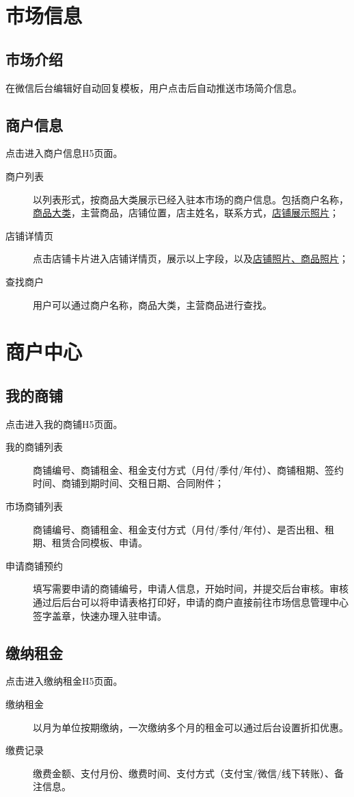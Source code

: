 \documentclass[12pt,a4paper,openany]{ctexrep}
\begin{document}
\section{市场信息}
\subsection{市场介绍}
在微信后台编辑好自动回复模板，用户点击后自动推送市场简介信息。

\subsection{商户信息}
点击进入商户信息H5页面。
\begin{description}
\item[商户列表]以列表形式，按商品大类展示已经入驻本市场的商户信息。包括商户名称，\hyperref[main_business]{商品大类}，主营商品，店铺位置，店主姓名，联系方式，\hyperref[shop_cover]{店铺展示照片}；
\item[店铺详情页]点击店铺卡片进入店铺详情页，展示以上字段，以及\hyperref[shop_cover]{店铺照片、商品照片}；
\item[查找商户]用户可以通过商户名称，商品大类，主营商品进行查找。
\end{description}

\section{商户中心}
\subsection{我的商铺}
点击进入我的商铺H5页面。
\begin{description}
\item[我的商铺列表]商铺编号、商铺租金、租金支付方式（月付/季付/年付）、商铺租期、签约时间、商铺到期时间、交租日期、合同附件；
\item[市场商铺列表]商铺编号、商铺租金、租金支付方式（月付/季付/年付）、是否出租、租期、租赁合同模板、申请。
\item[申请商铺预约]填写需要申请的商铺编号，申请人信息，开始时间，并提交后台审核。审核通过后后台可以将申请表格打印好，申请的商户直接前往市场信息管理中心签字盖章，快速办理入驻申请。
\end{description}

\subsection{缴纳租金}
点击进入缴纳租金H5页面。
\begin{description}
\item[缴纳租金]以月为单位按期缴纳，一次缴纳多个月的租金可以通过后台设置折扣优惠。
\item[缴费记录]缴费金额、支付月份、缴费时间、支付方式（支付宝/微信/线下转账）、备注信息。
\end{description}
\end{document}
